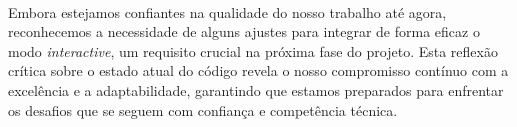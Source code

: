 \documentclass{article}
\begin{document}
\paragraph{}Embora estejamos confiantes na qualidade do nosso trabalho até agora, reconhecemos a necessidade de alguns ajustes para integrar de forma eficaz o modo \textit{interactive}, um requisito crucial na próxima fase do projeto. Esta reflexão crítica sobre o estado atual do código revela o nosso compromisso contínuo com a excelência e a adaptabilidade, garantindo que estamos preparados para enfrentar os desafios que se seguem com confiança e competência técnica.
\end{document}
